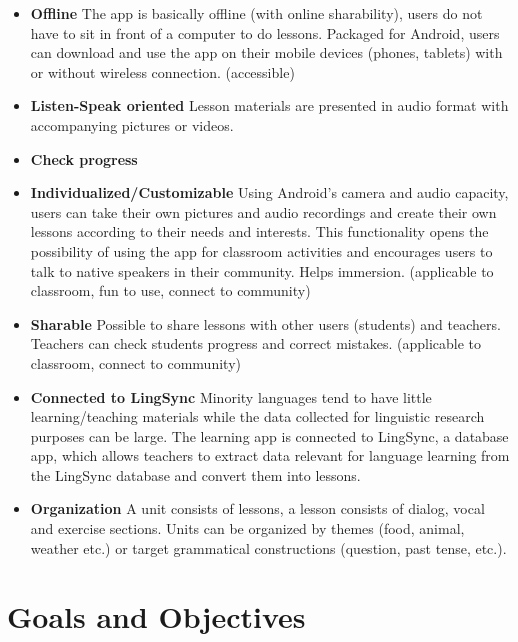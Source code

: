 \documentclass[12pt]{article} %
\begin{document}
\begin{itemize}  %
\item {\bf Offline} The app is basically offline (with online sharability), users do not have to sit in front of a computer to do lessons. Packaged for Android, users can download and use the app on their mobile devices (phones, tablets) with or without wireless connection. (accessible)

\item {\bf Listen-Speak oriented} Lesson materials are presented in audio format with accompanying pictures or videos. 

\item {\bf Check progress} 

\item {\bf Individualized/Customizable} Using Android's camera and audio capacity, users can take their own pictures and audio recordings and create their own lessons according to their needs and interests. This functionality opens the possibility of using the app for classroom activities and encourages users to talk to native speakers in their community.  Helps immersion. (applicable to classroom, fun to use, connect to community)





\item {\bf Sharable} Possible to share lessons with other users (students) and teachers. Teachers can check students progress and correct mistakes. (applicable to classroom, connect to community) 


\item {\bf Connected to LingSync} Minority languages tend to have little learning/teaching materials while the data collected for linguistic research purposes can be large. The learning app is connected to LingSync, a database app, which allows teachers to extract data relevant for language learning from the LingSync database and convert them into lessons. 

\item {\bf Organization} A unit consists of lessons,  a lesson consists of dialog, vocal and exercise sections. Units can be organized by themes (food, animal, weather etc.) or target grammatical constructions (question, past tense, etc.). 


\end{itemize} 

\section{Goals and Objectives} 
\end{document}
